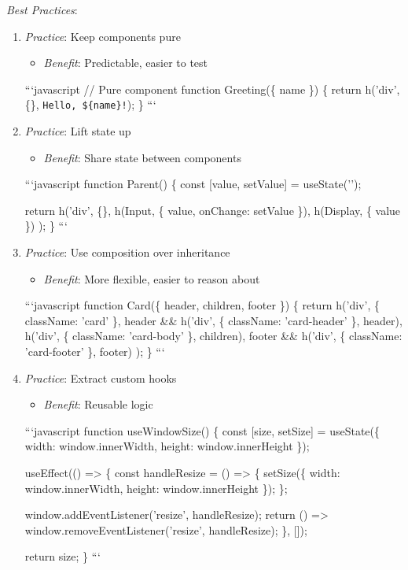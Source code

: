 \documentclass[11pt]{article}
\begin{document}
\emph{Best Practices}:

\begin{enumerate}
\item \emph{Practice}: Keep components pure
\begin{itemize}
\item \emph{Benefit}: Predictable, easier to test
\end{itemize}
```javascript
// Pure component
function Greeting(\{ name \}) \{
  return h('div', \{\}, \texttt{Hello, \$\{name\}!});
\}
```

\item \emph{Practice}: Lift state up
\begin{itemize}
\item \emph{Benefit}: Share state between components
\end{itemize}
```javascript
function Parent() \{
  const [value, setValue] = useState('');

  return h('div', \{\},
    h(Input, \{ value, onChange: setValue \}),
    h(Display, \{ value \})
  );
\}
```

\item \emph{Practice}: Use composition over inheritance
\begin{itemize}
\item \emph{Benefit}: More flexible, easier to reason about
\end{itemize}
```javascript
function Card(\{ header, children, footer \}) \{
  return h('div', \{ className: 'card' \},
    header \&\& h('div', \{ className: 'card-header' \}, header),
    h('div', \{ className: 'card-body' \}, children),
    footer \&\& h('div', \{ className: 'card-footer' \}, footer)
  );
\}
```

\item \emph{Practice}: Extract custom hooks
\begin{itemize}
\item \emph{Benefit}: Reusable logic
\end{itemize}
```javascript
function useWindowSize() \{
  const [size, setSize] = useState(\{
    width: window.innerWidth,
    height: window.innerHeight
  \});

useEffect(() => \{
  const handleResize = () => \{
    setSize(\{
      width: window.innerWidth,
      height: window.innerHeight
    \});
  \};

  window.addEventListener('resize', handleResize);
  return () => window.removeEventListener('resize', handleResize);
\}, []);

  return size;
\}
```
\end{enumerate}
\end{document}
